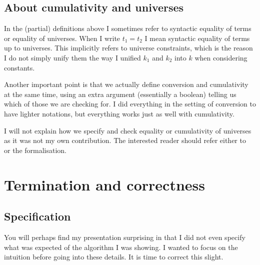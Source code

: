 \subsection{About cumulativity and universes}

In the (partial) definitions above I sometimes refer to syntactic equality of
terms or equality of universes. When I write \(t_1 = t_2\) I mean syntactic
equality of terms up to universes. This implicitly refers to universe
constraints, which is the reason I do not simply unify them the way I unified
\(k_1\) and \(k_2\) into \(k\) when considering constants.

Another important point is that we actually define conversion and cumulativity
at the same time, using an extra argument (essentially a boolean) telling us
which of those we are checking for.
I did everything in the setting of conversion to have lighter notations, but
everything works just as well with cumulativity.

I will not explain how we specify and check equality or cumulativity of
universes as it was not my own contribution.
The interested reader should refer either to~ or the
formalisation.

\section{Termination and correctness}

\subsection{Specification}

You will perhaps find my presentation surprising in that I did not even specify
what was expected of the algorithm I was showing. I wanted to focus on the
intuition before going into these details.
It is time to correct this slight.

